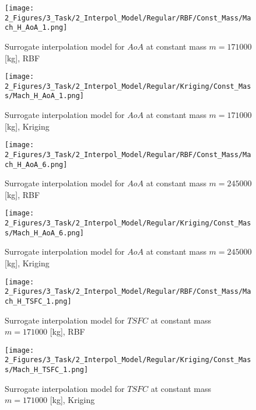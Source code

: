 \begin{figure}[!h]
    \begin{minipage}[h]{0.46\textwidth}
        \centering
        \texttt{[image: 2\_Figures/3\_Task/2\_Interpol\_Model/Regular/RBF/Const\_Mass/Mach\_H\_AoA\_1.png]}
        \caption{Surrogate interpolation model for $AoA$ at constant mass $m = 171000$ [kg], RBF}
        \label{fig_76}    
    \end{minipage}
    \hfill
    \begin{minipage}{0.46\textwidth}
        \centering
        \texttt{[image: 2\_Figures/3\_Task/2\_Interpol\_Model/Regular/Kriging/Const\_Mass/Mach\_H\_AoA\_1.png]}
        \caption{Surrogate interpolation model for $AoA$ at constant mass $m = 171000$ [kg], Kriging}
        \label{fig_77}    
    \end{minipage}
\end{figure} 

\begin{figure}[!h]
    \begin{minipage}[h]{0.46\textwidth}
        \centering
        \texttt{[image: 2\_Figures/3\_Task/2\_Interpol\_Model/Regular/RBF/Const\_Mass/Mach\_H\_AoA\_6.png]}
        \caption{Surrogate interpolation model for $AoA$ at constant mass $m = 245000$ [kg], RBF}
        \label{fig_78}    
    \end{minipage}
    \hfill
    \begin{minipage}{0.46\textwidth}
        \centering
        \texttt{[image: 2\_Figures/3\_Task/2\_Interpol\_Model/Regular/Kriging/Const\_Mass/Mach\_H\_AoA\_6.png]}
        \caption{Surrogate interpolation model for $AoA$ at constant mass $m = 245000$ [kg], Kriging}
        \label{fig_79}    
    \end{minipage}
\end{figure} 

\begin{figure}[!h]
    \begin{minipage}[h]{0.46\textwidth}
        \centering
        \texttt{[image: 2\_Figures/3\_Task/2\_Interpol\_Model/Regular/RBF/Const\_Mass/Mach\_H\_TSFC\_1.png]}
        \caption{Surrogate interpolation model for $TSFC$ at constant mass $m = 171000$ [kg], RBF}
        \label{fig_80}    
    \end{minipage}
    \hfill
    \begin{minipage}{0.46\textwidth}
        \centering
        \texttt{[image: 2\_Figures/3\_Task/2\_Interpol\_Model/Regular/Kriging/Const\_Mass/Mach\_H\_TSFC\_1.png]}
        \caption{Surrogate interpolation model for $TSFC$ at constant mass $m = 171000$ [kg], Kriging}
        \label{fig_81}    
    \end{minipage}
\end{figure} 


